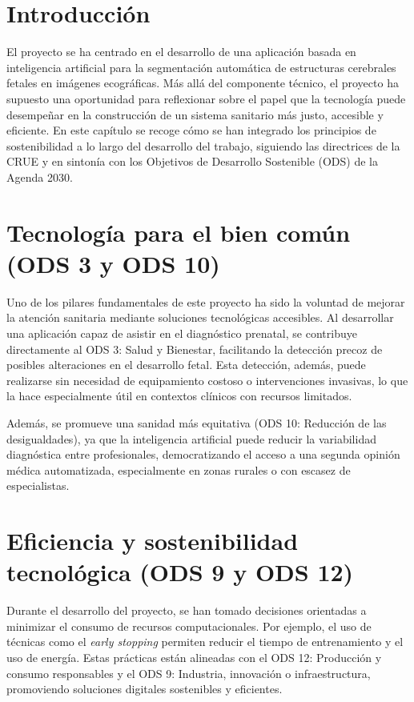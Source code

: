 
\section{Introducción}
El proyecto se ha centrado en el desarrollo de una aplicación basada en inteligencia artificial para la segmentación automática de estructuras cerebrales fetales en imágenes ecográficas. Más allá del componente técnico, el proyecto ha supuesto una oportunidad para reflexionar sobre el papel que la tecnología puede desempeñar en la construcción de un sistema sanitario más justo, accesible y eficiente. En este capítulo se recoge cómo se han integrado los principios de sostenibilidad a lo largo del desarrollo del trabajo, siguiendo las directrices de la CRUE y en sintonía con los Objetivos de Desarrollo Sostenible (ODS) de la Agenda 2030.

\section{Tecnología para el bien común (ODS 3 y ODS 10)}
Uno de los pilares fundamentales de este proyecto ha sido la voluntad de mejorar la atención sanitaria mediante soluciones tecnológicas accesibles. Al desarrollar una aplicación capaz de asistir en el diagnóstico prenatal, se contribuye directamente al ODS 3: Salud y Bienestar, facilitando la detección precoz de posibles alteraciones en el desarrollo fetal. Esta detección, además, puede realizarse sin necesidad de equipamiento costoso o intervenciones invasivas, lo que la hace especialmente útil en contextos clínicos con recursos limitados.

Además, se promueve una sanidad más equitativa (ODS 10: Reducción de las desigualdades), ya que la inteligencia artificial puede reducir la variabilidad diagnóstica entre profesionales, democratizando el acceso a una segunda opinión médica automatizada, especialmente en zonas rurales o con escasez de especialistas.
\section{Eficiencia y sostenibilidad tecnológica (ODS 9 y ODS 12)}
Durante el desarrollo del proyecto, se han tomado decisiones orientadas a minimizar el consumo de recursos computacionales. Por ejemplo, el uso de técnicas como el \textit{early stopping} permiten reducir el tiempo de entrenamiento y el uso de energía. Estas prácticas están alineadas con el ODS 12: Producción y consumo responsables y el ODS 9: Industria, innovación o infraestructura, promoviendo soluciones digitales sostenibles y eficientes.

